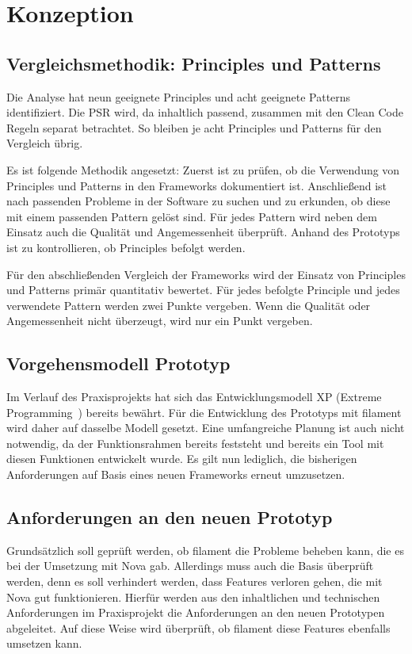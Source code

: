 \newpage


\section{Konzeption}

\subsection{Vergleichsmethodik: Principles und Patterns}
Die Analyse hat neun geeignete Principles und acht geeignete Patterns identifiziert.
Die PSR wird, da inhaltlich passend, zusammen mit den Clean Code Regeln separat betrachtet.
So bleiben je acht Principles und Patterns für den Vergleich übrig.

Es ist folgende Methodik angesetzt:
Zuerst ist zu prüfen, ob die Verwendung von Principles und Patterns in den Frameworks dokumentiert ist.
Anschließend ist nach passenden Probleme in der Software zu suchen und zu erkunden, ob diese mit einem passenden Pattern gelöst sind.
Für jedes Pattern wird neben dem Einsatz auch die Qualität und Angemessenheit überprüft.
Anhand des Prototyps ist zu kontrollieren, ob Principles befolgt werden.

Für den abschließenden Vergleich der Frameworks wird der Einsatz von Principles und Patterns primär quantitativ bewertet.
Für jedes befolgte Principle und jedes verwendete Pattern werden zwei Punkte vergeben.
Wenn die Qualität oder Angemessenheit nicht überzeugt, wird nur ein Punkt vergeben.

\subsection{Vorgehensmodell Prototyp}
Im Verlauf des Praxisprojekts hat sich das Entwicklungsmodell XP (Extreme Programming~\cite{agile-prozesse}) bereits bewährt.
Für die Entwicklung des Prototyps mit filament wird daher auf dasselbe Modell gesetzt.
Eine umfangreiche Planung ist auch nicht notwendig, da der Funktionsrahmen bereits feststeht und bereits ein Tool mit diesen Funktionen entwickelt wurde.
Es gilt nun lediglich, die bisherigen Anforderungen auf Basis eines neuen Frameworks erneut umzusetzen.

\newpage

\subsection{Anforderungen an den neuen Prototyp}
Grundsätzlich soll geprüft werden, ob filament die Probleme beheben kann, die es bei der Umsetzung mit Nova gab.
Allerdings muss auch die Basis überprüft werden, denn es soll verhindert werden, dass Features verloren gehen, die mit Nova gut funktionieren.
Hierfür werden aus den inhaltlichen und technischen Anforderungen im Praxisprojekt die Anforderungen an den neuen Prototypen abgeleitet.
Auf diese Weise wird überprüft, ob filament diese Features ebenfalls umsetzen kann.

